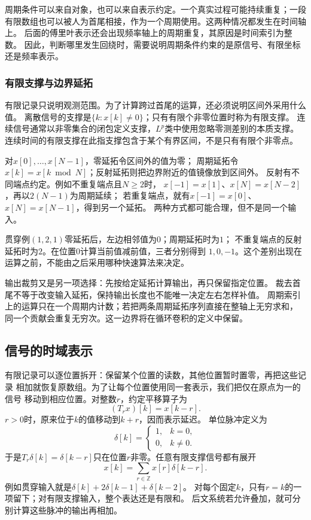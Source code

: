 周期条件可以来自对象，也可以来自表示约定。一个真实过程可能持续重复；一段
有限数组也可以被人为首尾相接，作为一个周期使用。这两种情况都发生在时间轴上。
后面的傅里叶表示还会出现频率轴上的周期重复，其原因是时间索引为整数。
因此，判断哪里发生回绕时，需要说明周期条件约束的是原信号、有限坐标还是频率表示。

\subsubsection{有限支撑与边界延拓}

有限记录只说明观测范围。为了计算跨过首尾的运算，还必须说明区间外采用什么值。
离散信号的支撑是$\{k:x[k]\neq0\}$；只有有限个非零位置时称为有限支撑。
连续信号通常以非零集合的闭包定义支撑，$L^p$类中使用忽略零测差别的本质支撑。
连续时间的有限支撑在此指支撑包含于某个有界区间，不是只有有限个非零点。

对$x[0],\ldots,x[N-1]$，零延拓令区间外的值为零；
周期延拓令$x[k]=x[k\bmod N]$；反射延拓则把边界附近的值镜像放到区间外。
反射有不同端点约定。例如不重复端点且$N\geq2$时，
$x[-1]=x[1]$、$x[N]=x[N-2]$，再以$2(N-1)$为周期延续；
若重复端点，就有$x[-1]=x[0]$、$x[N]=x[N-1]$，得到另一个延拓。
两种方式都可能合理，但不是同一个输入。

贯穿例$(1,2,1)$零延拓后，左边相邻值为$0$；周期延拓时为$1$；
不重复端点的反射延拓时为$2$。在位置$0$计算当前值减前值，三者分别得到
$1,0,-1$。这个差别出现在运算之前，不能由之后采用哪种快速算法来决定。

输出裁剪又是另一项选择：先按给定延拓计算输出，再只保留指定位置。
裁去首尾不等于改变输入延拓，保持输出长度也不能唯一决定左右怎样补值。
周期索引上的运算只在一个周期内计数；若把两条周期延拓序列直接在整轴上无穷求和，
同一个贡献会重复无穷次。这一边界将在循环卷积的定义中保留。

\subsection{信号的时域表示}
\label{sec:signal-time-impulses}

有限记录可以逐位置拆开：保留某个位置的读数，其他位置暂时置零，再把这些记录
相加就恢复原数组。为了让每个位置使用同一套表示，我们把仅在原点为一的信号
移动到相应位置。对整数$r$，约定平移算子为
\[
  (T_rx)[k]=x[k-r].
\]
$r>0$时，原来位于$k$的值移动到$k+r$，因而表示延迟。
单位脉冲定义为
\[
  \delta[k]=
  \begin{cases}
    1,&k=0,\\
    0,&k\neq0.
  \end{cases}
\]
于是$T_r\delta[k]=\delta[k-r]$只在位置$r$非零。任意有限支撑信号都有展开
\begin{equation}
  x[k]=\sum_{r\in\mathbb Z}x[r]\delta[k-r].
  \label{eq:signal-analysis-impulse-expansion}
\end{equation}
例如贯穿输入就是$\delta[k]+2\delta[k-1]+\delta[k-2]$。
对每个固定$k$，只有$r=k$的一项留下；对有限支撑输入，整个表达还是有限和。
后文系统若允许叠加，就可分别计算这些脉冲的输出再相加。

